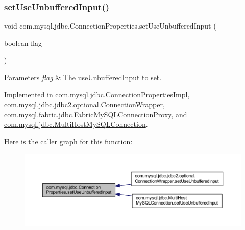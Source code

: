 \subsubsection{\texorpdfstring{set\+Use\+Unbuffered\+Input()}{setUseUnbufferedInput()}}
{\footnotesize\ttfamily void com.\+mysql.\+jdbc.\+Connection\+Properties.\+set\+Use\+Unbuffered\+Input (\begin{DoxyParamCaption}\item[{boolean}]{flag }\end{DoxyParamCaption})}


\begin{DoxyParams}{Parameters}
{\em flag} & The use\+Unbuffered\+Input to set. \\
\hline
\end{DoxyParams}


Implemented in \mbox{\hyperlink{classcom_1_1mysql_1_1jdbc_1_1_connection_properties_impl_a8b5296b57383965f755f0d435a2868a0}{com.\+mysql.\+jdbc.\+Connection\+Properties\+Impl}}, \mbox{\hyperlink{classcom_1_1mysql_1_1jdbc_1_1jdbc2_1_1optional_1_1_connection_wrapper_ad2f5596971575bf1d10abdea85e86509}{com.\+mysql.\+jdbc.\+jdbc2.\+optional.\+Connection\+Wrapper}}, \mbox{\hyperlink{classcom_1_1mysql_1_1fabric_1_1jdbc_1_1_fabric_my_s_q_l_connection_proxy_a7b70a567c875c147f3461c4714099e76}{com.\+mysql.\+fabric.\+jdbc.\+Fabric\+My\+S\+Q\+L\+Connection\+Proxy}}, and \mbox{\hyperlink{classcom_1_1mysql_1_1jdbc_1_1_multi_host_my_s_q_l_connection_a19da5784ea3e4f024042178f171d0441}{com.\+mysql.\+jdbc.\+Multi\+Host\+My\+S\+Q\+L\+Connection}}.

Here is the caller graph for this function\+:\nopagebreak
\begin{figure}[H]
\begin{center}
\leavevmode
\includegraphics[width=350pt]{interfacecom_1_1mysql_1_1jdbc_1_1_connection_properties_a5a30b9513cdbfaf75d822a3942c5bf6b_icgraph}
\end{center}
\end{figure}
\mbox{\label{interfacecom_1_1mysql_1_1jdbc_1_1_connection_properties_a2b78e87d6cfd73e15066b8bdbc0cecb0}} 
